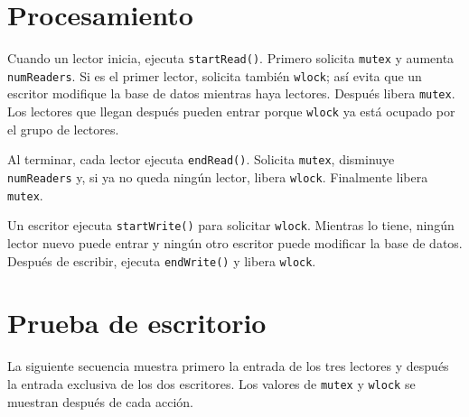 \documentclass[12pt,oneside]{template/liverpoolthesis}
\begin{document}
\section{Procesamiento}

Cuando un lector inicia, ejecuta \texttt{startRead()}. Primero solicita
\texttt{mutex} y aumenta \texttt{numReaders}. Si es el primer lector,
solicita también \texttt{wlock}; así evita que un escritor modifique la base
de datos mientras haya lectores. Después libera \texttt{mutex}. Los lectores
que llegan después pueden entrar porque \texttt{wlock} ya está ocupado por el
grupo de lectores.

Al terminar, cada lector ejecuta \texttt{endRead()}. Solicita \texttt{mutex},
disminuye \texttt{numReaders} y, si ya no queda ningún lector, libera
\texttt{wlock}. Finalmente libera \texttt{mutex}.

Un escritor ejecuta \texttt{startWrite()} para solicitar \texttt{wlock}.
Mientras lo tiene, ningún lector nuevo puede entrar y ningún otro escritor
puede modificar la base de datos. Después de escribir, ejecuta
\texttt{endWrite()} y libera \texttt{wlock}.

\section{Prueba de escritorio}

La siguiente secuencia muestra primero la entrada de los tres lectores y
después la entrada exclusiva de los dos escritores. Los valores de
\texttt{mutex} y \texttt{wlock} se muestran después de cada acción.
\end{document}
